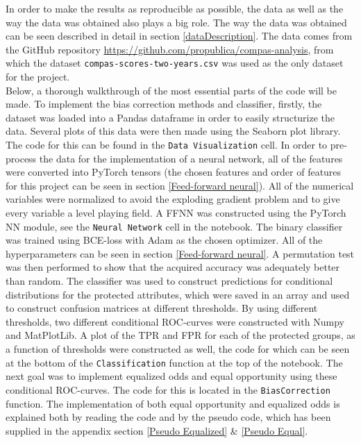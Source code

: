 \documentclass[11pt, fleqn, titlepage]{article}
\begin{document}
	In order to make the results as reproducible as possible, the data as well as the way the data was obtained also plays a big role. The way the data was obtained can be seen described in detail in section \ref{dataDescription}. The data comes from the GitHub repository \url{https://github.com/propublica/compas-analysis}, from which the dataset \texttt{compas-scores-two-years.csv} was used as the only dataset for the project. \\
	
	\noindent Below, a thorough walkthrough of the most essential parts of the code will be made. To implement the bias correction methods and classifier, firstly, the dataset was loaded into a Pandas dataframe in order to easily structurize the data. Several plots of this data were then made using the Seaborn plot library. The code for this can be found in the \texttt{Data Visualization} cell. In order to pre-process the data for the implementation of a neural network, all of the features were converted into PyTorch tensors (the chosen features and order of features for this project can be seen in section \ref{Feed-forward neural}). All of the numerical variables were normalized to avoid the exploding gradient problem and to give every variable a level playing field. A FFNN was constructed using the PyTorch NN module, see the \texttt{Neural Network} cell in the notebook. The binary classifier was trained using BCE-loss with Adam as the chosen optimizer. All of the hyperparameters can be seen in section \ref{Feed-forward neural}. A permutation test was then performed to show that the acquired accuracy was adequately better than random. The classifier was used to construct predictions for conditional distributions for the protected attributes, which were saved in an array and used to construct confusion matrices at different thresholds. By using different thresholds, two  different conditional ROC-curves were constructed with Numpy and MatPlotLib. A plot of the TPR and FPR for each of the protected groups, as a function of thresholds were constructed as well, the code for which can be seen at the bottom of the \texttt{Classification} function at the top of the notebook. The next goal was to implement equalized odds and equal opportunity using these conditional ROC-curves. The code for this is located in the \texttt{BiasCorrection} function. The implementation of both equal opportunity and equalized odds is explained both by reading the code and by the pseudo code, which has been supplied in the appendix section \ref{Pseudo Equalized} \& \ref{Pseudo Equal}.
	
\end{document}
